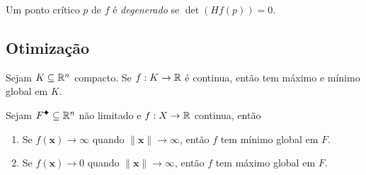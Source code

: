     
\begin{definition}
   Um ponto crítico \(p\) de \(f\) é \emph{degenerado} se \(\det (Hf(p)) =0\).  
\end{definition}


\subsection{Otimização}

\begin{theorem}
    Sejam \(K\subseteq \mathbb{R}^n\) compacto. Se \(f:K\to \mathbb{R}\) é continua, então tem máximo e mínimo global em \(K\). 
\end{theorem}
%     

\begin{lemma}
    Sejam \(F\ce\subseteq \R^n\) não limitado e \(f:X\to \mathbb{R}\) continua, então  
    \begin{enumerate}[label=\roman*.]
        \item Se \(f(\textbf{x})\to \infty \) quando \(\|\textbf{x}\|\to \infty \), então \(f\) tem mínimo global em \(F\).
        \item Se \(f(\textbf{x}) \to 0\) quando \(\|\textbf{x}\|\to \infty\), então \(f\) tem máximo global em \(F\).
    \end{enumerate}   
\end{lemma}


